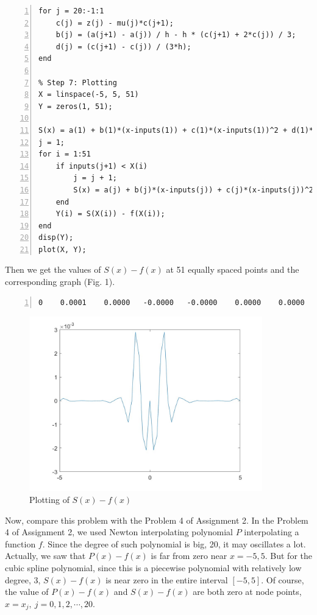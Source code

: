 \documentclass{article}
\begin{document}
\begin{enumerate}
\begin{lstlisting}[frame=single, numbers=left, style=Matlab-editor]
% Step 6
for j = 20:-1:1
    c(j) = z(j) - mu(j)*c(j+1);
    b(j) = (a(j+1) - a(j)) / h - h * (c(j+1) + 2*c(j)) / 3;
    d(j) = (c(j+1) - c(j)) / (3*h);
end

% Step 7: Plotting
X = linspace(-5, 5, 51)
Y = zeros(1, 51);

S(x) = a(1) + b(1)*(x-inputs(1)) + c(1)*(x-inputs(1))^2 + d(1)*(x-inputs(1))^3;
j = 1;
for i = 1:51
    if inputs(j+1) < X(i)
        j = j + 1;
        S(x) = a(j) + b(j)*(x-inputs(j)) + c(j)*(x-inputs(j))^2 + d(j)*(x-inputs(j))^3;
    end
    Y(i) = S(X(i)) - f(X(i));
end
disp(Y);
plot(X, Y);        
    \end{lstlisting} Then we get the values of $S(x)-f(x)$ at 51 equally spaced points and the corresponding graph (Fig. 1). \begin{lstlisting}[frame=single, numbers=left, style=Matlab-editor]
0    0.0001    0.0000   -0.0000   -0.0000    0.0000    0.0000    0.0000   -0.0000   -0.0000   -0.0000   -0.0000    0.0000   -0.0000   -0.0001    0.0000    0.0001    0.0001   -0.0003   -0.0009   -0.0000    0.0029    0.0019   -0.0015   -0.0021    0.0000   -0.0021   -0.0015    0.0019    0.0029   -0.0000   -0.0009   -0.0003    0.0001    0.0001   -0.0000   -0.0001   -0.0000    0.0000   -0.0000    0.0000   -0.0000   -0.0000    0.0000    0.0000    0.0000   -0.0000   -0.0000    0.0000    0.0001   -0.0000
    \end{lstlisting} \begin{figure}[h] %
        \includegraphics[width=0.9\textwidth]{assignment_3_2_fig.jpg}
        \centering
        \caption{Plotting of $S(x)-f(x)$}
    \end{figure} Now, compare this problem with the Problem 4 of Assignment 2. In the Problem 4 of Assignment 2, we used Newton interpolating polynomial $P$ interpolating a function $f$. Since the degree of such polynomial is big, 20, it may oscillates a lot. Actually, we saw that $P(x)-f(x)$ is far from zero near $x=-5, 5$. But for the cubic spline polynomial, since this is a piecewise polynomial with relatively low degree, 3, $S(x)-f(x)$ is near zero in the entire interval $[-5, 5]$. Of course, the value of $P(x)-f(x)$ and $S(x)-f(x)$ are both zero at node points, $x=x_j,\ j=0,1,2,\cdots,20$.


\end{enumerate}
\end{document}

